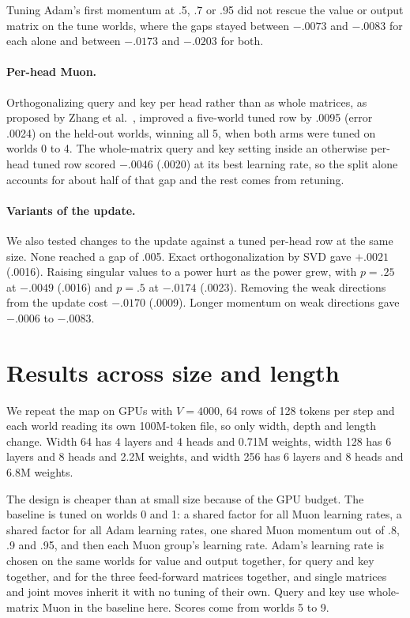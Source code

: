 \documentclass[11pt]{article}
\begin{document}
Tuning Adam's first momentum at .5, .7 or .95 did not rescue the value or output matrix on the tune worlds, where the gaps stayed between $-.0073$ and $-.0083$ for each alone and between $-.0173$ and $-.0203$ for both.

\paragraph{Per-head Muon.} Orthogonalizing query and key per head rather than as whole matrices, as proposed by Zhang et al.~\cite{groupmuon}, improved a five-world tuned row by .0095 (error .0024) on the held-out worlds, winning all 5, when both arms were tuned on worlds 0 to 4. The whole-matrix query and key setting inside an otherwise per-head tuned row scored $-.0046$ (.0020) at its best learning rate, so the split alone accounts for about half of that gap and the rest comes from retuning.

\paragraph{Variants of the update.} We also tested changes to the update against a tuned per-head row at the same size. None reached a gap of .005. Exact orthogonalization by SVD gave $+.0021$ (.0016). Raising singular values to a power hurt as the power grew, with $p=.25$ at $-.0049$ (.0016) and $p=.5$ at $-.0174$ (.0023). Removing the weak directions from the update cost $-.0170$ (.0009). Longer momentum on weak directions gave $-.0006$ to $-.0083$.

\section{Results across size and length}

We repeat the map on GPUs with $V=4000$, 64 rows of 128 tokens per step and each world reading its own 100M-token file, so only width, depth and length change. Width 64 has 4 layers and 4 heads and 0.71M weights, width 128 has 6 layers and 8 heads and 2.2M weights, and width 256 has 6 layers and 8 heads and 6.8M weights.

The design is cheaper than at small size because of the GPU budget. The baseline is tuned on worlds 0 and 1: a shared factor for all Muon learning rates, a shared factor for all Adam learning rates, one shared Muon momentum out of .8, .9 and .95, and then each Muon group's learning rate. Adam's learning rate is chosen on the same worlds for value and output together, for query and key together, and for the three feed-forward matrices together, and single matrices and joint moves inherit it with no tuning of their own. Query and key use whole-matrix Muon in the baseline here. Scores come from worlds 5 to 9.
\end{document}
